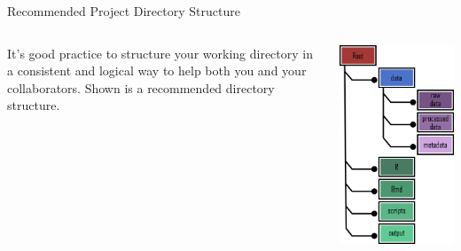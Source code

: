 \documentclass[aspectratio=169,xcolor=dvipsnames]{beamer}
\begin{document}
\begin{frame}{Recommended Project Directory Structure}

\begin{columns}
        \begin{column}{0.5\textwidth}
	It’s good practice to structure your working directory in a consistent and logical way to help both you and your collaborators. Shown is a recommended directory structure.
        \end{column}

        \begin{column}{0.5\textwidth}
            \centering
            \includegraphics[scale=0.33]{images/dir.png}
        \end{column}
    \end{columns}
\end{frame}
\end{document}
